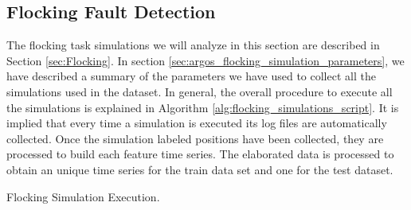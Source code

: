 \documentclass[../../Thesis.tex]{subfiles}
\begin{document}
		\subsection{Flocking Fault Detection}
		\label{sec:experiments:flocking_fault_detection}%
			The flocking task simulations we will analyze in this section are described in Section \ref{sec:Flocking}. In section \ref{sec:argos_flocking_simulation_parameters}, we have described a summary of the parameters we have used to collect all the simulations used in the dataset. In general, the overall procedure to execute all the simulations is explained in Algorithm \ref{alg:flocking_simulations_script}. It is implied that every time a simulation is executed its log files are automatically collected. Once the simulation labeled positions have been collected, they are processed to build each feature time series. The elaborated data is processed to obtain an unique time series for the train data set and one for the test dataset. 
			\begin{algorithm}
	 		 	\caption{Flocking Simulation Execution.}
	 		 	\label{alg:flocking_simulations_script}
			    	\begin{algorithmic}[1]
				    	\ENDFOR
			    	\ENDFOR
					    	\ENDFOR
				    	\ENDFOR
			    	\ENDFOR
					    	\ENDFOR
				    	\ENDFOR
			    	\ENDFOR
			    	\end{algorithmic}
			\end{algorithm}
			
\end{document}
